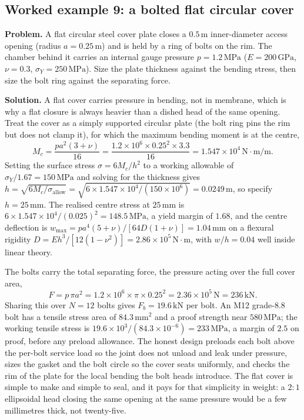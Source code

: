 \subsection*{Worked example 9: a bolted flat circular cover}

\textbf{Problem.} A flat circular steel cover plate closes a
$0.5\,\si{\meter}$ inner-diameter access opening (radius $a = 0.25\,
\si{\meter}$) and is held by a ring of bolts on the rim. The chamber
behind it carries an internal gauge pressure $p = 1.2\,\text{MPa}$
($E = 200\,\text{GPa}$, $\nu = 0.3$, $\sigma_Y = 250\,\text{MPa}$).
Size the plate thickness against the bending stress, then size the bolt
ring against the separating force.

\textbf{Solution.} A flat cover carries pressure in bending, not in
membrane, which is why a flat closure is always heavier than a dished
head of the same opening. Treat the cover as a simply supported circular
plate (the bolt ring pins the rim but does not clamp it), for which the
maximum bending moment is at the centre,
\[
M_c = \frac{p a^2 (3+\nu)}{16}
= \frac{1.2\times 10^6 \times 0.25^2 \times 3.3}{16}
= 1.547\times 10^4\,\text{N}\cdot\text{m}/\text{m}.
\]
Setting the surface stress $\sigma = 6 M_c/h^2$ to a working allowable of
$\sigma_Y/1.67 = 150\,\text{MPa}$ and solving for the thickness gives
$h = \sqrt{6 M_c/\sigma_{\text{allow}}} = \sqrt{6\times 1.547\times
10^4/(150\times 10^6)} = 0.0249\,\si{\meter}$, so specify $h = 25\,
\si{\milli\meter}$. The realised centre stress at $25\,\si{\milli\meter}$
is $6\times 1.547\times 10^4/(0.025)^2 = 148.5\,\text{MPa}$, a yield
margin of $1.68$, and the centre deflection is $w_{\max} = p a^4(5+\nu)/
[64 D(1+\nu)] = 1.04\,\si{\milli\meter}$ on a flexural rigidity
$D = E h^3/[12(1-\nu^2)] = 2.86\times 10^5\,\text{N}\cdot\text{m}$, with
$w/h = 0.04$ well inside linear theory.

The bolts carry the total separating force, the pressure acting over the
full cover area,
\[
F = p\,\pi a^2 = 1.2\times 10^6 \times \pi \times 0.25^2 = 2.36\times
10^5\,\text{N} = 236\,\text{kN}.
\]
Sharing this over $N = 12$ bolts gives $F_b = 19.6\,\text{kN}$ per bolt.
An M12 grade-$8.8$ bolt has a tensile stress area of $84.3\,\si{\milli
\meter}^2$ and a proof strength near $580\,\text{MPa}$; the working
tensile stress is $19.6\times 10^3/(84.3\times 10^{-6}) = 233\,\text{
MPa}$, a margin of $2.5$ on proof, before any preload allowance. The
honest design preloads each bolt above the per-bolt service load so the
joint does not unload and leak under pressure, sizes the gasket and the
bolt circle so the cover seats uniformly, and checks the rim of the
plate for the local bending the bolt heads introduce. The flat cover is
simple to make and simple to seal, and it pays for that simplicity in
weight: a $2{:}1$ ellipsoidal head closing the same opening at the same
pressure would be a few millimetres thick, not twenty-five.


